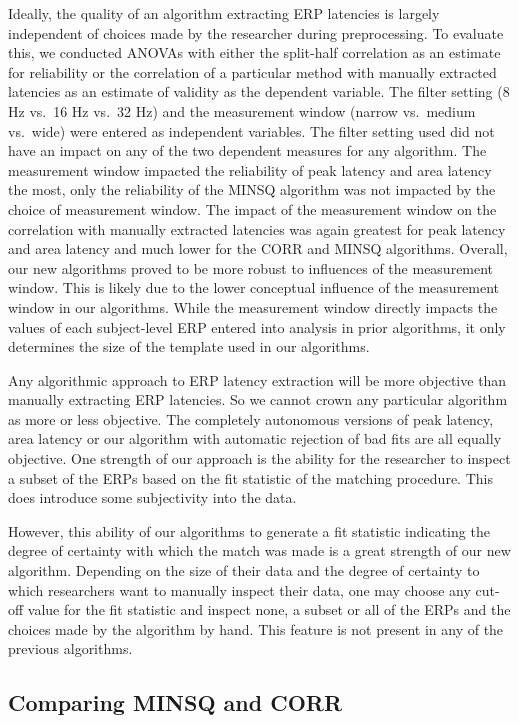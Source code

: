 \documentclass[
  man]{apa7}
\begin{document}
Ideally, the quality of an algorithm extracting ERP latencies is largely independent of choices made by the researcher during preprocessing. To evaluate this, we conducted ANOVAs with either the split-half correlation as an estimate for reliability or the correlation of a particular method with manually extracted latencies as an estimate of validity as the dependent variable. The filter setting (8 Hz vs.~16 Hz vs.~32 Hz) and the measurement window (narrow vs.~medium vs.~wide) were entered as independent variables. The filter setting used did not have an impact on any of the two dependent measures for any algorithm. The measurement window impacted the reliability of peak latency and area latency the most, only the reliability of the MINSQ algorithm was not impacted by the choice of measurement window. The impact of the measurement window on the correlation with manually extracted latencies was again greatest for peak latency and area latency and much lower for the CORR and MINSQ algorithms. Overall, our new algorithms proved to be more robust to influences of the measurement window. This is likely due to the lower conceptual influence of the measurement window in our algorithms. While the measurement window directly impacts the values of each subject-level ERP entered into analysis in prior algorithms, it only determines the size of the template used in our algorithms.

Any algorithmic approach to ERP latency extraction will be more objective than manually extracting ERP latencies. So we cannot crown any particular algorithm as more or less objective. The completely autonomous versions of peak latency, area latency or our algorithm with automatic rejection of bad fits are all equally objective. One strength of our approach is the ability for the researcher to inspect a subset of the ERPs based on the fit statistic of the matching procedure. This does introduce some subjectivity into the data.

However, this ability of our algorithms to generate a fit statistic indicating the degree of certainty with which the match was made is a great strength of our new algorithm. Depending on the size of their data and the degree of certainty to which researchers want to manually inspect their data, one may choose any cut-off value for the fit statistic and inspect none, a subset or all of the ERPs and the choices made by the algorithm by hand. This feature is not present in any of the previous algorithms.

\hypertarget{comparing-minsq-and-corr}{%
\subsection{Comparing MINSQ and CORR}\label{comparing-minsq-and-corr}}
\end{document}
